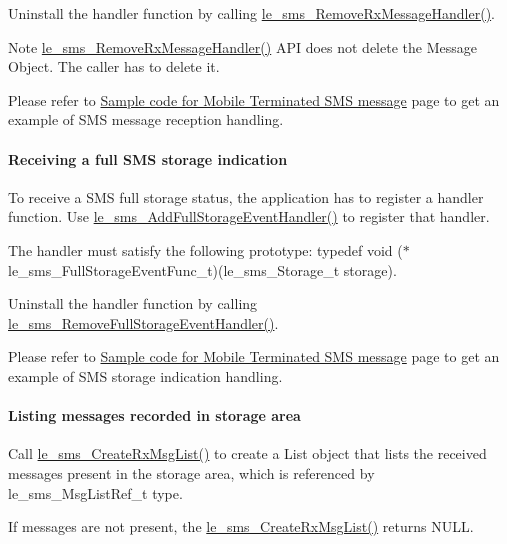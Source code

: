 Uninstall the handler function by calling {\ttfamily \hyperlink{le__sms__interface_8h_a469a4d08b9ccb8b61ed7b8294e6ee3ef}{le\+\_\+sms\+\_\+\+Remove\+Rx\+Message\+Handler()}}. \begin{DoxyNote}{Note}
{\ttfamily \hyperlink{le__sms__interface_8h_a469a4d08b9ccb8b61ed7b8294e6ee3ef}{le\+\_\+sms\+\_\+\+Remove\+Rx\+Message\+Handler()}} A\+PI does not delete the Message Object. The caller has to delete it.
\end{DoxyNote}
Please refer to \hyperlink{c_smsSampleMT}{Sample code for Mobile Terminated S\+MS message} page to get an example of S\+MS message reception handling.\hypertarget{c_sms_le_sms_ops_sms_storage}{}\paragraph{Receiving a full S\+M\+S storage indication}\label{c_sms_le_sms_ops_sms_storage}
To receive a S\+MS full storage status, the application has to register a handler function. Use {\ttfamily \hyperlink{le__sms__interface_8h_a1ae7c04f5de9245489956e62bd607430}{le\+\_\+sms\+\_\+\+Add\+Full\+Storage\+Event\+Handler()}} to register that handler.

The handler must satisfy the following prototype\+: {\ttfamily typedef} void ($\ast$le\+\_\+sms\+\_\+\+Full\+Storage\+Event\+Func\+\_\+t)(le\+\_\+sms\+\_\+\+Storage\+\_\+t storage).

Uninstall the handler function by calling {\ttfamily \hyperlink{le__sms__interface_8h_ad4f895d18ab6a6456c0914c7f4bfb8b7}{le\+\_\+sms\+\_\+\+Remove\+Full\+Storage\+Event\+Handler()}}.

Please refer to \hyperlink{c_smsSampleMT}{Sample code for Mobile Terminated S\+MS message} page to get an example of S\+MS storage indication handling.\hypertarget{c_sms_le_sms_ops_listing}{}\paragraph{Listing  messages recorded in storage area}\label{c_sms_le_sms_ops_listing}
Call {\ttfamily \hyperlink{le__sms__interface_8h_aee4328f9e417108fa16794cc135073d0}{le\+\_\+sms\+\_\+\+Create\+Rx\+Msg\+List()}} to create a List object that lists the received messages present in the storage area, which is referenced by {\ttfamily le\+\_\+sms\+\_\+\+Msg\+List\+Ref\+\_\+t} type.

If messages are not present, the \hyperlink{le__sms__interface_8h_aee4328f9e417108fa16794cc135073d0}{le\+\_\+sms\+\_\+\+Create\+Rx\+Msg\+List()} returns N\+U\+LL.

